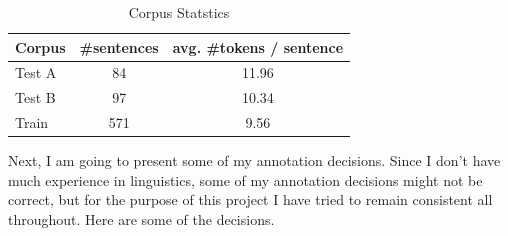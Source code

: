 \documentclass[11pt,letterpaper]{article}
\begin{document}
\begin{table}
\begin{center}
  \begin{tabular}{ l | c | c }
  \hline
  Corpus & \#sentences & avg. \#tokens / sentence\\
  \hline
  Test A & 84 & 11.96\\
  \hline
  Test B & 97 & 10.34\\
  \hline
  Train & 571 & 9.56\\
  \hline
     \end{tabular}
\end{center}
\caption{Corpus Statstics}
\label{Corpus_Stat}
\end{table}

Next, I am going to present some of my annotation decisions. Since I don't have much experience in linguistics, some of my annotation decisions might not be correct, but for the purpose of this project I have tried to remain consistent all throughout. Here are some of the decisions.
\end{document}
